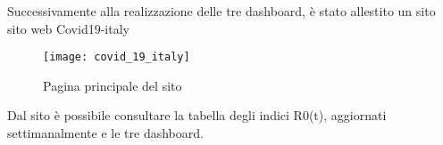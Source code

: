 \setlength{\parskip}{1em}

Successivamente alla realizzazione delle tre dashboard, è stato allestito un sito sito web Covid19-italy

\begin{figure}[htp]
    \centering
    \texttt{[image: covid\_19\_italy]}
    \caption{Pagina principale del sito}
\end{figure}

Dal sito è possibile consultare la tabella degli indici R0(t), aggiornati settimanalmente e le tre dashboard.